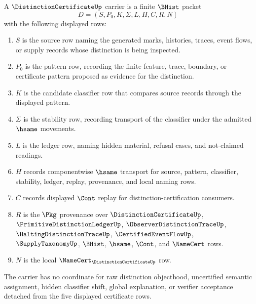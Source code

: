 \begin{definition}
\label{def:distinction-certificate-carrier}
A $\DistinctionCertificateUp$ carrier is a finite $\BHist$ packet
$$
D=(S,P_0,K,\Sigma,L,H,C,R,N)
$$
with the following displayed rows:
\begin{enumerate}
\item $S$ is the source row naming the generated marks, histories, traces, event flows, or supply records whose distinction is being inspected.
\item $P_0$ is the pattern row, recording the finite feature, trace, boundary, or certificate pattern proposed as evidence for the distinction.
\item $K$ is the candidate classifier row that compares source records through the displayed pattern.
\item $\Sigma$ is the stability row, recording transport of the classifier under the admitted $\hsame$ movements.
\item $L$ is the ledger row, naming hidden material, refusal cases, and not-claimed readings.
\item $H$ records componentwise $\hsame$ transport for source, pattern, classifier, stability, ledger, replay, provenance, and local naming rows.
\item $C$ records displayed $\Cont$ replay for distinction-certification consumers.
\item $R$ is the $\Pkg$ provenance over $\DistinctionCertificateUp$, $\PrimitiveDistinctionLedgerUp$, $\ObserverDistinctionTraceUp$, $\HaltingDistinctionTraceUp$, $\CertifiedEventFlowUp$, $\SupplyTaxonomyUp$, $\BHist$, $\hsame$, $\Cont$, and $\NameCert$ rows.
\item $N$ is the local $\NameCert_{\DistinctionCertificateUp}$ row.
\end{enumerate}
The carrier has no coordinate for raw distinction objecthood, uncertified semantic assignment, hidden classifier shift, global explanation, or verifier acceptance detached from the five displayed certificate rows.
\end{definition}

